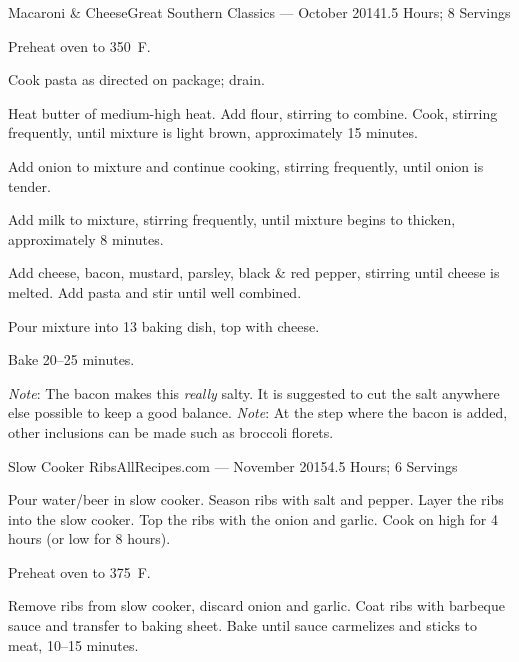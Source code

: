 \documentclass{article}
\begin{document}
\begin{recipe}{Macaroni \& Cheese}{Great Southern Classics --- October 2014}{1.5 Hours; 8 Servings}

   \newstep
   Preheat oven to 350\ \0F.

   Cook pasta as directed on package; drain.

   Heat butter of medium-high heat.  Add flour, stirring to combine.  Cook,
   stirring frequently, until mixture is light brown, approximately 15 minutes.

   Add onion to mixture and continue cooking, stirring frequently, until onion
   is tender.

   Add milk to mixture, stirring frequently, until mixture begins to thicken,
   approximately 8 minutes.


   Add cheese, bacon, mustard, parsley, black \& red pepper, stirring until
   cheese is melted.  Add pasta and stir until well combined.

   Pour mixture into 13 baking dish, top with cheese.

   \newstep
   Bake 20--25 minutes.

   \freeform
   \emph{Note}: The bacon makes this \emph{really} salty.  It is suggested to
   cut the salt anywhere else possible to keep a good balance.
   \newline\newline
   \emph{Note}: At the step where the bacon is added, other inclusions can be
   made such as broccoli florets.

\end{recipe}

\begin{recipe}{Slow Cooker Ribs}{AllRecipes.com --- November 2015}{4.5 Hours; 6 Servings}

   Pour water/beer in slow cooker.  Season ribs with salt and pepper.  Layer the
ribs into the slow cooker.  Top the ribs with the onion and garlic.  Cook on
high for 4 hours (or low for 8 hours).

   \newstep
   Preheat oven to 375\ \0F.

   Remove ribs from slow cooker, discard onion and garlic.  Coat ribs with
   barbeque sauce and transfer to baking sheet.  Bake until sauce carmelizes and
   sticks to meat, 10--15 minutes.

\end{recipe}
\end{document}

